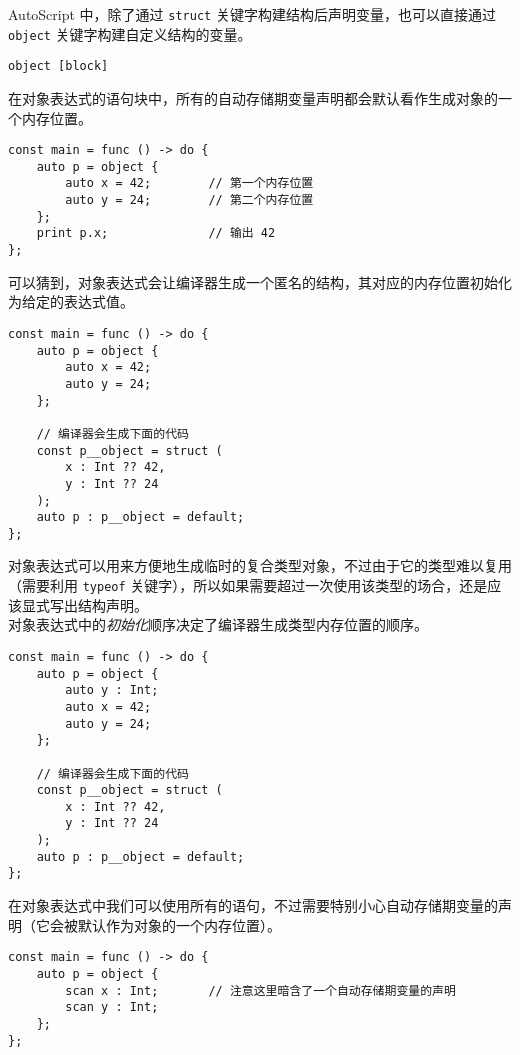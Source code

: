 AutoScript 中，除了通过 \lstinline!struct! 关键字构建结构后声明变量，也可以直接通过 \lstinline!object! 关键字构建自定义结构的变量。

\begin{grammar}[对象表达式] \label{grm:object-expression}
	\lstinline!object [block]!
\end{grammar}

在对象表达式的语句块中，所有的自动存储期变量声明都会默认看作生成对象的一个内存位置。

\begin{lstlisting}
const main = func () -> do {
	auto p = object {
		auto x = 42;		// 第一个内存位置
		auto y = 24;		// 第二个内存位置
	};
	print p.x;				// 输出 42
};
\end{lstlisting}

可以猜到，对象表达式会让编译器生成一个匿名的结构，其对应的内存位置初始化为给定的表达式值。

\begin{lstlisting}
const main = func () -> do {
	auto p = object {
		auto x = 42;
		auto y = 24;
	};
	
	// 编译器会生成下面的代码
	const p__object = struct (
		x : Int ?? 42,
		y : Int ?? 24
	);
	auto p : p__object = default;
};
\end{lstlisting}

对象表达式可以用来方便地生成临时的复合类型对象，不过由于它的类型难以复用（需要利用 \lstinline!typeof! 关键字），所以如果需要超过一次使用该类型的场合，还是应该显式写出结构声明。 \\

对象表达式中的\emph{初始化}顺序决定了编译器生成类型内存位置的顺序。

\begin{lstlisting}
const main = func () -> do {
    auto p = object {
        auto y : Int;
        auto x = 42;
        auto y = 24;
    };
    
    // 编译器会生成下面的代码
    const p__object = struct (
        x : Int ?? 42,
        y : Int ?? 24
    );
    auto p : p__object = default;
};
\end{lstlisting}

在对象表达式中我们可以使用所有的语句，不过需要特别小心自动存储期变量的声明（它会被默认作为对象的一个内存位置）。

\begin{lstlisting}
const main = func () -> do {
	auto p = object {
		scan x : Int;		// 注意这里暗含了一个自动存储期变量的声明
		scan y : Int;
	};
};
\end{lstlisting}

